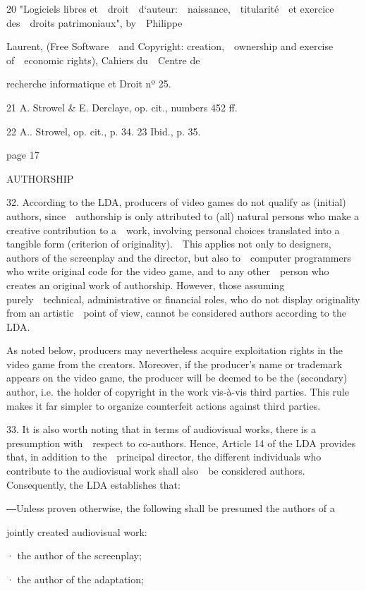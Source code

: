 \documentclass[
]{article}
\begin{document}
{20 }{"}{Logiciels libres
et~~droit~~d`auteur:~~naissance,~~titularité~~et }{exercice des~~droits
patrimoniaux"}{, by~~Philippe}

{Laurent, }{(}{Free Software~~and Copyright: creation,~~ownership and
exercise of~~economic rights), Cahiers du~~Centre de}

{recherche informatique et Droit nº 25}{.}

{21 }{A. Strowel \& E. Derclaye, }{op. cit.}{, numbers 452 ff.}

{22 }{A.. Strowel, }{op. cit.}{, p. 34. }{23 }{Ibid.}{, p. 35.}

{page 17}

{AUTHORSHIP}

{32. }{According to the LDA, producers of video games do not qualify as
(initial) authors, since~~authorship is only attributed to (all) natural
persons who make a creative contribution to a~~work, involving personal
choices translated into a tangible form (criterion of
originality).~~This applies not only to designers, authors of the
screenplay and the director, but also to~~computer programmers who write
original code for the video game, and to any other~~person who creates
an original work of authorship. However, those assuming
purely~~technical, administrative or financial roles, who do not display
originality from an artistic~~point of view, cannot be considered
authors according to the LDA.}

{As noted below, producers may nevertheless acquire exploitation rights
in the video game from the creators. }{Moreover, if the producer's name
or tra}{demark appears on the video game, the producer will be deemed to
be the (secondary) author, i.e. the holder of copyright in the work
}{vis-à-vis }{third parties. This rule makes it far simpler to organize
counterfeit actions against third parties.}

{33. }{It is also worth noting that in terms of audiovisual works, there
is a presumption with~~respect to co-authors. Hence, Article 14 of the
LDA provides that, in addition to the~~principal director, the different
individuals who contribute to the audiovisual work shall also~~be
considered authors}{. }{Consequently, the LDA establishes that:}

{―}{Unless proven otherwise, the following shall be presumed the authors
of a}

{jointly created audiovisual work:}

{· the author of the screenplay;}

{· the author of the adaptation;}
\end{document}
